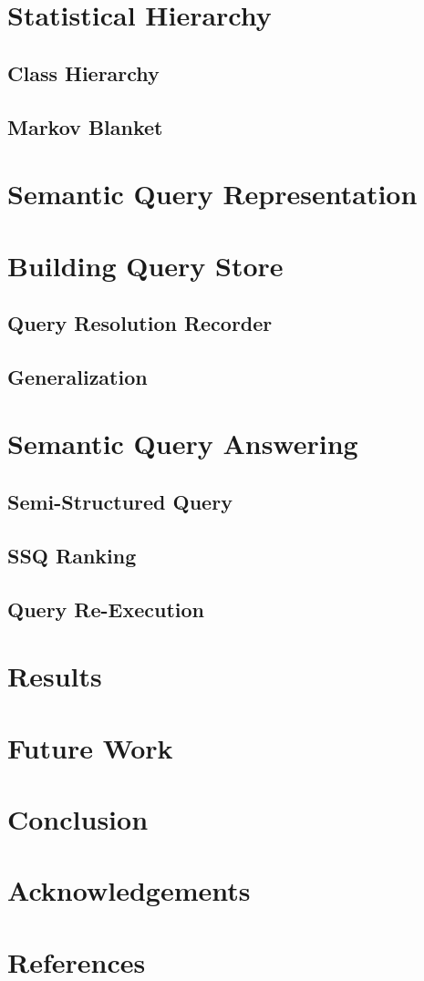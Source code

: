 \documentclass{www2010-submission}
\begin{document}
\section{Statistical Hierarchy}
\subsection*{Class Hierarchy}
\subsection*{Markov Blanket}

\section{Semantic Query Representation}

\section{Building Query Store}
\subsection{Query Resolution Recorder}
\subsection{Generalization}

\section{Semantic Query Answering}
\subsection{Semi-Structured Query}
\subsection{SSQ Ranking}
\subsection{Query Re-Execution}

\section{Results}

\section{Future Work}

\section{Conclusion}

\section{Acknowledgements}

\section{References}
\end{document}
